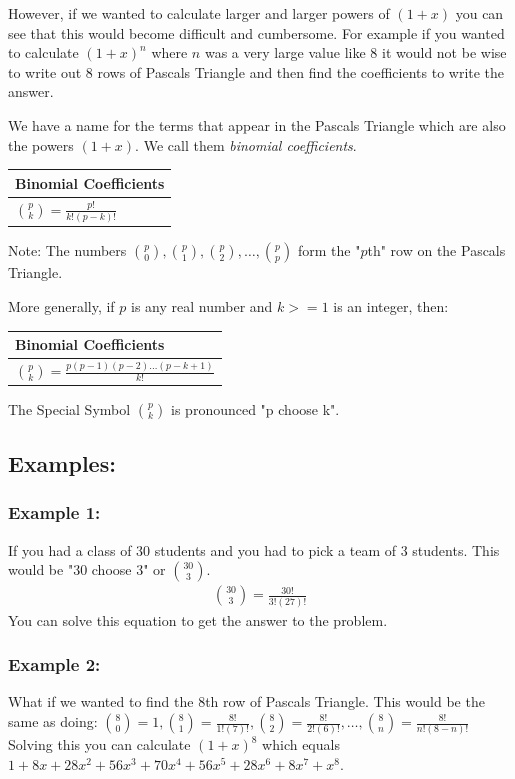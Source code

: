 \documentclass[12pt]{article}
\newcommand{\formula}[2]{
    {\renewcommand{\arraystretch}{2}
        \begin{center}
        \begin{tabular}{|p{0.9\textwidth}|}
        \hline
        \textbf{#1} \\
        \hline
        #2 \\
        \hline
        \end{tabular}
        \end{center}
    }
}
\begin{document}
\newpage

However, if we wanted to calculate larger and larger powers of $(1+x)$ you can see that this would become difficult and cumbersome. For example if you wanted to calculate $(1+x)^n$ where $n$ was a very large value like $8$ it would not be wise to write out $8$ rows of Pascals Triangle and then find the coefficients to write the answer.

We have a name for the terms that appear in the Pascals Triangle which are also the powers $(1+x)$. We call them \textit{binomial coefficients}.

\formula{Binomial Coefficients}{$\binom{p}{k} = \frac{p!}{k!(p-k)!}$}
Note: The numbers $\binom{p}{0}, \binom{p}{1}, \binom{p}{2}, \dotsc, \binom{p}{p}$ form the "$p$th" row on the Pascals Triangle.

\vspace{\baselineskip}

More generally, if $p$ is any real number and $k >= 1$ is an integer, then:

\formula{Binomial Coefficients}{$\binom{p}{k} = \frac{p(p-1)(p-2)\dotsc(p-k+1)}{k!}$}

The Special Symbol $\binom{p}{k}$ is pronounced "p choose k".

\subsection{Examples: }

\subsubsection{Example 1: }
If you had a class of 30 students and you had to pick a team of 3 students. This would be "30 choose 3" or $\binom{30}{3}$.
\begin{gather*}
\binom{30}{3} = \frac{30!}{3!(27)!}
\end{gather*}
You can solve this equation to get the answer to the problem.
\vspace{\baselineskip}

\subsubsection{Example 2: }
What if we wanted to find the 8th row of Pascals Triangle.
\vspace{\baselineskip}
This would be the same as doing: $\binom{8}{0} = 1, \binom{8}{1} = \frac{8!}{1!(7)!}, \binom{8}{2} = \frac{8!}{2!(6)!}, \dotsc, \binom{8}{n} = \frac{8!}{n!(8-n)!}$
\vspace{\baselineskip}
Solving this you can calculate $(1+x)^8$ which equals $1 + 8x + 28x^2 + 56x^3 + 70x^4 + 56x^5 + 28x^6 + 8x^7 + x^8$.
\vspace{\baselineskip}
\end{document}
